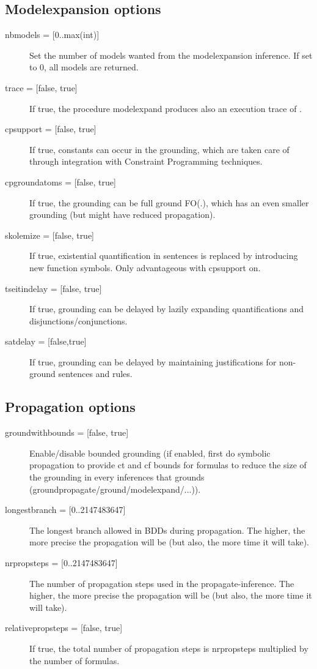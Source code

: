 \subsection{Modelexpansion options}
\begin{description}
	\item[{nbmodels = [0..max(int)]}] Set the number of models wanted from the modelexpansion inference.  If set to 0, all models are returned.
	\item[{trace = [false, true]}] If true, the procedure modelexpand produces also an execution trace of \minisatid.
	\item[{cpsupport = [false, true]}] If true, constants can occur in the grounding, which are taken care of through integration with Constraint Programming techniques. 
	\item[{cpgroundatoms = [false, true]}] If true, the grounding can be full ground FO(.), which has an even smaller grounding (but might have reduced propagation).
	\item[{skolemize = [false, true]}] If true, existential quantification in sentences is replaced by introducing new function symbols. Only advantageous with cpsupport on.
	\item[{tseitindelay = [false, true]}] If true, grounding can be delayed by lazily expanding quantifications and disjunctions/conjunctions.
	\item[{satdelay = [false,true]}] If true, grounding can be delayed by maintaining justifications for non-ground sentences and rules.
\end{description}

\subsection{Propagation options}
\begin{description}
	\item[{groundwithbounds = [false, true]}] Enable/disable bounded grounding (if enabled, first do symbolic propagation to provide ct and cf bounds for formulas to reduce the size of the grounding in every inferences that grounds (groundpropagate/ground/modelexpand/...)).
	\item[{longestbranch = [0..2147483647]}] The longest branch allowed in BDDs during propagation. The higher, the more precise the propagation will be (but also, the more time it will take).
	\item[{nrpropsteps = [0..2147483647]}] The number of propagation steps used in the propagate-inference. The higher, the more precise the propagation will be (but also, the more time it will take).
	\item[{relativepropsteps =  [false, true]}] If true, the total number of propagation steps is nrpropsteps multiplied by the number of formulas.
\end{description}

